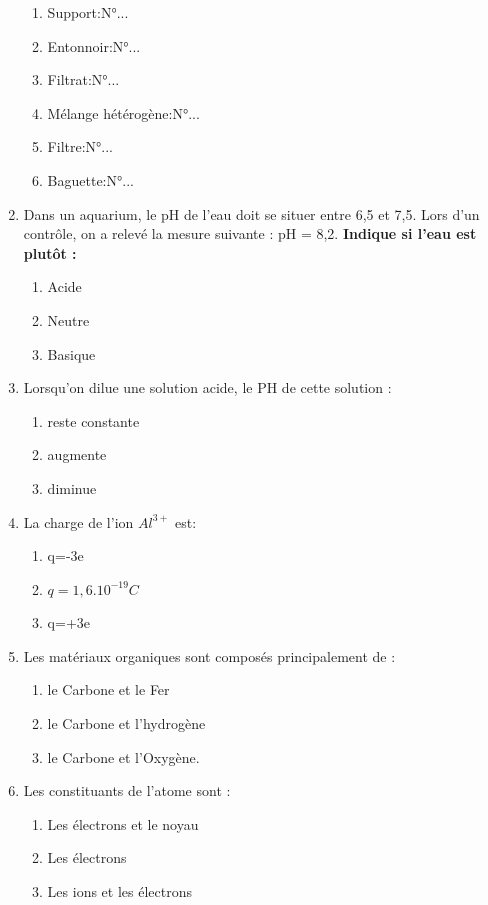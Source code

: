 \documentclass[12pt]{article}
\begin{document}
\begin{multicols}{2}
\begin{enumerate}
\begin{minipage}{\linewidth}
\end{minipage}
	\begin{enumerate}
		\item  Support:N°...
		\item  Entonnoir:N°...
		\item  Filtrat:N°...
		\item  Mélange hétérogène:N°...
		\item  Filtre:N°...
		\item  Baguette:N°...
	\end{enumerate}
\item Dans un aquarium, le pH de l’eau doit se situer entre 6,5 et 7,5. Lors d’un contrôle, on a relevé la mesure suivante : pH = 8,2. \textbf{Indique si l’eau est plutôt :}
	\begin{enumerate}
		\item  Acide
		\item  Neutre
		\item  Basique
	\end{enumerate}
\item Lorsqu'on dilue une solution acide, le PH de cette solution :
	\begin{enumerate}
		\item reste constante
		\item augmente
		\item diminue
		\end{enumerate}
	\item La charge de l’ion $Al^{3+}$ est:
		\begin{enumerate}
			\item q=-3e
			\item $q=1,6.10^{-19}C$
			\item q=+3e
		\end{enumerate}
	\item Les matériaux organiques sont composés principalement de :
		\begin{enumerate}
			\item le Carbone et le Fer
			\item le Carbone et l’hydrogène
			\item le Carbone et l’Oxygène.
		\end{enumerate}
	\item Les constituants de l’atome sont : 
		\begin{enumerate}
			\item Les électrons et le noyau
			\item Les électrons
			\item Les ions et les électrons

\end{enumerate}
\end{enumerate}
\end{multicols}
\end{document}
